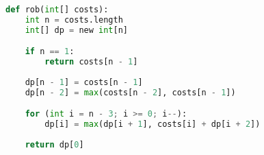 \documentclass[preview]{standalone}
\begin{document}
\begin{center}
\begin{lstlisting}[language=Python]
def rob(int[] costs):
    int n = costs.length
    int[] dp = new int[n]

    if n == 1:
        return costs[n - 1]
    
    dp[n - 1] = costs[n - 1]
    dp[n - 2] = max(costs[n - 2], costs[n - 1])

    for (int i = n - 3; i >= 0; i--):
        dp[i] = max(dp[i + 1], costs[i] + dp[i + 2])
    
    return dp[0]
\end{lstlisting}
\end{center}
\end{document}
